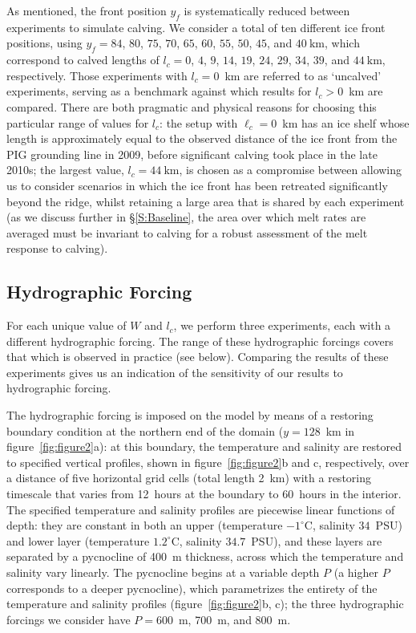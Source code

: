 \documentclass[draft]{agujournal2019}
\begin{document}
As mentioned, the front position $y_f$ is systematically reduced between experiments to simulate calving. We consider a total of ten different ice front positions, using $y_f=84$, $80$, $75$, $70$, $65$, $60$, $55$, $50$, $45$, and $40~\text{km}$, which correspond to calved lengths of $l_c=0$, $4$, $9$, $14$, $19$, $24$, $29$, $34$, $39$, and $44~\text{km}$, respectively. Those experiments with $l_c = 0$~km are referred to as `uncalved' experiments, serving as a benchmark against which results for $l_c >0$~km are compared. There are both pragmatic and physical reasons for choosing this particular range of values for $l_c$: the setup with $\ell_c = 0$~km has an ice shelf whose length is approximately equal to the observed distance of the ice front from the PIG grounding line in 2009, before significant calving took place in the late 2010s; the largest value, $l_c = 44~\text{km}$, is chosen as a compromise between allowing us to consider scenarios in which the ice front has been retreated significantly beyond the ridge, whilst retaining a large area that is shared by each experiment (as we discuss further in \S\ref{S:Baseline}, the area over which melt rates are averaged must be invariant to calving for a robust assessment of the melt response to calving).

\subsection{Hydrographic Forcing}\label{S:Experiment:Hydrography}
For each unique value of $W$ and $l_c$, we perform three experiments, each with a different hydrographic forcing. The range of these hydrographic forcings covers that which is observed in practice (see below). Comparing the results of these experiments gives us an indication of the sensitivity of our results to hydrographic forcing. 

The hydrographic forcing is imposed on the model by means of a restoring boundary condition at the northern end of the domain ($y = 128$~km in figure~\ref{fig:figure2}a): at this boundary, the temperature and salinity are restored to specified vertical profiles, shown in figure~\ref{fig:figure2}b and c, respectively, over a distance of five horizontal grid cells (total length 2 km) with a restoring timescale that varies from 12~hours at the boundary to 60~hours in the interior.  The specified temperature and salinity profiles are piecewise linear functions of depth: they are constant in both an upper (temperature $-1^\circ$C, salinity $34$~PSU) and lower layer (temperature $1.2^\circ$C, salinity $34.7$~PSU), and these layers are separated by a pycnocline of 400~m thickness, across which the temperature and salinity vary linearly. The pycnocline begins at a variable depth $P$ (a higher $P$ corresponds to a deeper pycnocline), which parametrizes the entirety of the temperature and salinity profiles (figure~\ref{fig:figure2}b, c); the three hydrographic forcings we consider have $P=600$ m, 700 m, and 800 m.
\end{document}
